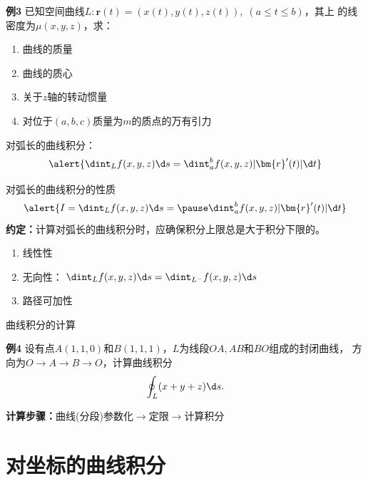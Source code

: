 \begin{frame}%
	\linespread{1.2}
	\begin{exampleblock}{{\bf 例3}\hfill}
		已知空间曲线$L:\bm{r}(t)=(x(t),y(t),z(t)),\;(a\leq t\leq b)$，其上
		的线密度为$\mu(x,y,z)$，求：
		\begin{enumerate}
		  \item 曲线的质量
		  \item 曲线的质心
		  \item 关于$z$轴的转动惯量
		  \item 对位于$(a,b,c)$质量为$m$的质点的万有引力
		\end{enumerate}
	\end{exampleblock}
	\pause 
	{\bb 对弧长的曲线积分：}
	$$\alert{\dint_Lf(x,y,z)\d s=\dint_a^bf(x,y,z)|\bm{r}'(t)|\d t}$$
\end{frame}

\begin{frame}{对弧长的曲线积分的性质}
	\linespread{1.2}
	$$\alert{I=\dint_Lf(x,y,z)\d s=\pause\dint_a^bf(x,y,z)|\bm{r}'(t)|\d t}$$\pause
	{{\bf 约定：}计算对弧长的曲线积分时，应确保积分上限总是大于积分下限的。}\pause 
	\begin{enumerate}
	  \item {\bb 线性性}\pause 
	  \item {\bb 无向性：}\pause
	  $\dint_Lf(x,y,z)\d s=\dint_{L^-}f(x,y,z)\d s$\pause
	  \item {\bb 路径可加性}
	\end{enumerate}
\end{frame}

\begin{frame}{曲线积分的计算}
	\linespread{1.2}
	\begin{exampleblock}{{\bf 例4}\hfill}
		设有点$A(1,1,0)$和$B(1,1,1)$，$L$为线段$OA,AB$和$BO$组成的封闭曲线，
		方向为$O\to A\to B\to O$，计算曲线积分
		$$\oint_L(x+y+z)\d s.$$
	\end{exampleblock}
	\pause \alert{{\bf 计算步骤：}曲线(分段)参数化$\to$定限$\to$计算积分}
\end{frame}

\section{对坐标的曲线积分}

